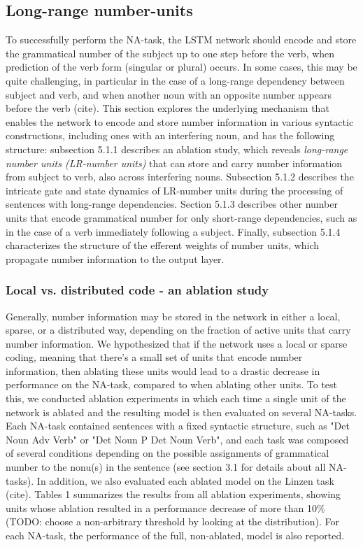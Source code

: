 \subsection{Long-range number-units}
To successfully perform the NA-task, the LSTM network should encode and store the grammatical number of the subject up to one step before the verb, when prediction of the verb form (singular or plural) occurs. 
In some cases, this may be quite challenging, in particular in the case of a long-range dependency between subject and verb, and when another noun with an opposite number appears before the verb (cite). 
This section explores the underlying mechanism that enables the network to encode and store number information in various syntactic constructions, including ones with an interfering noun, and has the following structure: subsection 5.1.1 describes an ablation study, which reveals \textit{long-range number units (LR-number units)} that can store and carry number information from subject to verb, also across interfering nouns. 
Subsection 5.1.2 describes the intricate gate and state dynamics of LR-number units during the processing of sentences with long-range dependencies. 
Section 5.1.3 describes other number units that encode grammatical number for only short-range dependencies, such as in the case of a verb immediately following a subject. 
Finally, subsection 5.1.4 characterizes the structure of the efferent weights of number units, which propagate number information to the output layer.

\subsubsection{Local vs. distributed code - an ablation study}
Generally, number information may be stored in the network in either a local, sparse, or a distributed way, depending on the fraction of active units that carry number information. 
We hypothesized that if the network uses a local or sparse coding, meaning that there's a small set of units that encode number information, then ablating these units would lead to a drastic decrease in performance on the NA-task, compared to when ablating other units. 
To test this, we conducted ablation experiments in which each time a single unit of the network is ablated and the resulting model is then evaluated on several NA-tasks. 
Each NA-task contained sentences with a fixed syntactic structure, such as "Det Noun Adv Verb" or "Det Noun P Det Noun Verb", and each task was composed of several conditions depending on the possible assignments of grammatical number to the nonu(s) in the sentence (see section 3.1 for details about all NA-tasks). 
In addition, we also evaluated each ablated model on the Linzen task (cite). 
Tables 1 summarizes the results from all ablation experiments, showing units whose ablation resulted in a performance decrease of more than 10\% (TODO: choose a non-arbitrary threshold by looking at the distribution). 
For each NA-task, the performance of the full, non-ablated, model is also reported.

